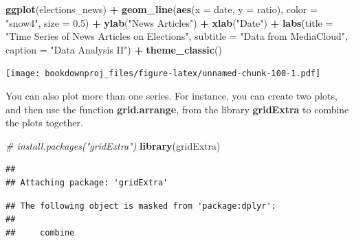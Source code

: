 \documentclass[
]{article}
\newenvironment{Shaded}{\begin{snugshade}}{\end{snugshade}}
\newcommand{\CommentTok}[1]{\textcolor[rgb]{0.56,0.35,0.01}{\textit{#1}}}
\newcommand{\DataTypeTok}[1]{\textcolor[rgb]{0.13,0.29,0.53}{#1}}
\newcommand{\FloatTok}[1]{\textcolor[rgb]{0.00,0.00,0.81}{#1}}
\newcommand{\KeywordTok}[1]{\textcolor[rgb]{0.13,0.29,0.53}{\textbf{#1}}}
\newcommand{\NormalTok}[1]{#1}
\newcommand{\OperatorTok}[1]{\textcolor[rgb]{0.81,0.36,0.00}{\textbf{#1}}}
\newcommand{\StringTok}[1]{\textcolor[rgb]{0.31,0.60,0.02}{#1}}
\begin{document}
\begin{Shaded}
\begin{Highlighting}[]
\KeywordTok{ggplot}\NormalTok{(elections_news) }\OperatorTok{+}
\StringTok{  }\KeywordTok{geom_line}\NormalTok{(}\KeywordTok{aes}\NormalTok{(}\DataTypeTok{x =}\NormalTok{ date, }\DataTypeTok{y =}\NormalTok{ ratio), }\DataTypeTok{color =} \StringTok{"snow4"}\NormalTok{, }\DataTypeTok{size =} \FloatTok{0.5}\NormalTok{) }\OperatorTok{+}
\StringTok{  }\KeywordTok{ylab}\NormalTok{(}\StringTok{"News Articles"}\NormalTok{) }\OperatorTok{+}
\StringTok{  }\KeywordTok{xlab}\NormalTok{(}\StringTok{"Date"}\NormalTok{) }\OperatorTok{+}
\StringTok{  }\KeywordTok{labs}\NormalTok{(}\DataTypeTok{title =} \StringTok{"Time Series of News Articles on Elections"}\NormalTok{,}
       \DataTypeTok{subtitle =} \StringTok{"Data from MediaCloud"}\NormalTok{,}
       \DataTypeTok{caption =} \StringTok{"Data Analysis II"}\NormalTok{) }\OperatorTok{+}
\StringTok{  }\KeywordTok{theme_classic}\NormalTok{()}
\end{Highlighting}
\end{Shaded}

\texttt{[image: bookdownproj\_files/figure-latex/unnamed-chunk-100-1.pdf]}

You can also plot more than one series. For instance, you can create two plots, and then use the function \textbf{grid.arrange}, from the library \textbf{gridExtra} to combine the plots together.

\begin{Shaded}
\begin{Highlighting}[]
\CommentTok{# install.packages("gridExtra")}
\KeywordTok{library}\NormalTok{(gridExtra)}
\end{Highlighting}
\end{Shaded}

\begin{verbatim}
## 
## Attaching package: 'gridExtra'
\end{verbatim}

\begin{verbatim}
## The following object is masked from 'package:dplyr':
## 
##     combine
\end{verbatim}
\end{document}
